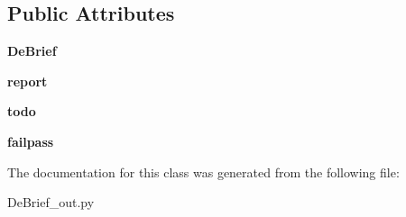 \subsection*{Public Attributes}
\begin{DoxyCompactItemize}
\item 
\hypertarget{classc_1_1_de_brief__out_1_1_de_brief_ae6f5e58ef0f38170992763b8a50f9c72}{}{\bfseries De\+Brief}\label{classc_1_1_de_brief__out_1_1_de_brief_ae6f5e58ef0f38170992763b8a50f9c72}

\item 
\hypertarget{classc_1_1_de_brief__out_1_1_de_brief_acf712b3697a9c9b3dc89bd88cb1abeb9}{}{\bfseries report}\label{classc_1_1_de_brief__out_1_1_de_brief_acf712b3697a9c9b3dc89bd88cb1abeb9}

\item 
\hypertarget{classc_1_1_de_brief__out_1_1_de_brief_a8d48df5adffd5429cbeace486b5eb531}{}{\bfseries todo}\label{classc_1_1_de_brief__out_1_1_de_brief_a8d48df5adffd5429cbeace486b5eb531}

\item 
\hypertarget{classc_1_1_de_brief__out_1_1_de_brief_a55ae08f575538e95cd1e8aa19864a108}{}{\bfseries failpass}\label{classc_1_1_de_brief__out_1_1_de_brief_a55ae08f575538e95cd1e8aa19864a108}

\end{DoxyCompactItemize}


The documentation for this class was generated from the following file\+:\begin{DoxyCompactItemize}
\item 
De\+Brief\+\_\+out.\+py\end{DoxyCompactItemize}
